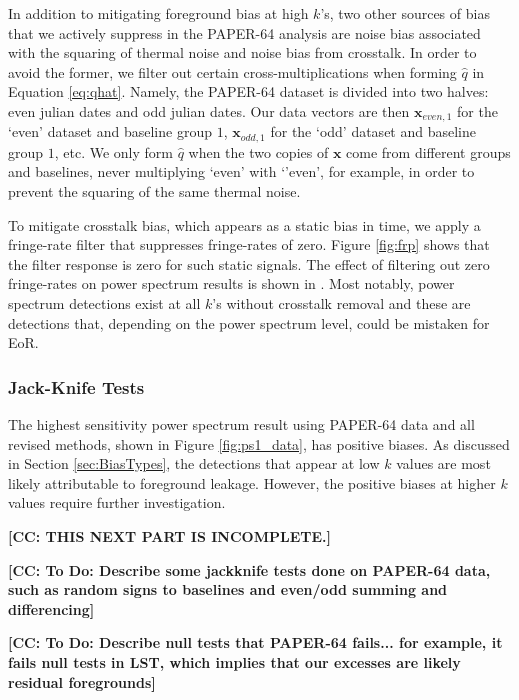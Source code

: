 \documentclass[preprint2,numberedappendix,tighten]{aastex6}  %
\newcommand{\cc}[1]{{\color{purple} \textbf{[CC: #1]}}}
\begin{document}
In addition to mitigating foreground bias at high $k$'s, two other sources of bias that we actively suppress in the PAPER-64 analysis are noise bias associated with the squaring of thermal noise and noise bias from crosstalk. In order to avoid the former, we filter out certain cross-multiplications when forming $\hat{q}$ in Equation \ref{eq:qhat}. Namely, the PAPER-64 dataset is divided into two halves: even julian dates and odd julian dates. Our data vectors are then $\textbf{x}_{even, 1}$ for the `even' dataset and baseline group $1$, $\textbf{x}_{odd, 1}$ for the `odd' dataset and baseline group $1$, etc. We only form $\hat{q}$ when the two copies of $\textbf{x}$ come from different groups and baselines, never multiplying `even' with `'even', for example, in order to prevent the squaring of the same thermal noise.

To mitigate crosstalk bias, which appears as a static bias in time, we apply a fringe-rate filter that suppresses fringe-rates of zero. Figure \ref{fig:frp} shows that the filter response is zero for such static signals. The effect of filtering out zero fringe-rates on power spectrum results is shown in \citet{ali_et_al2015}. Most notably, power spectrum detections exist at all $k$'s without crosstalk removal and these are detections that, depending on the power spectrum level, could be mistaken for EoR. 

\subsubsection{Jack-Knife Tests}

The highest sensitivity power spectrum result using PAPER-64 data and all revised methods, shown in Figure \ref{fig:ps1_data}, has positive biases. As discussed in Section \ref{sec:BiasTypes}, the detections that appear at low $k$ values are most likely attributable to foreground leakage. However, the positive biases at higher $k$ values require further investigation. 

\cc{THIS NEXT PART IS INCOMPLETE.}

\cc{To Do: Describe some jackknife tests done on PAPER-64 data, such as random signs to baselines and even/odd summing and differencing} 

\cc{To Do: Describe null tests that PAPER-64 fails... for example, it fails null tests in LST, which implies that our excesses are likely residual foregrounds}

\end{document}
